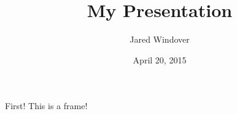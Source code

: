 \documentclass{beamer}
\title{My Presentation}
\author{Jared Windover}
\institute{University of the West Indies}
\date{April 20, 2015}
\begin{document}
\begin{frame}
\titlepage
\end{frame}

\begin{frame}{First!}
This is a frame!
\end{frame}
\end{document}
